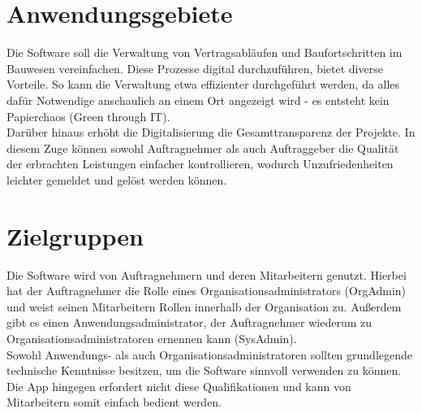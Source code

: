 \section{Anwendungsgebiete}
Die Software soll die Verwaltung von Vertragsabläufen und Baufortschritten im Bauwesen vereinfachen.
Diese Prozesse digital durchzuführen, bietet diverse Vorteile.
So kann die Verwaltung etwa effizienter durchgeführt werden, da alles dafür Notwendige anschaulich an einem Ort angezeigt wird - es entsteht kein Papierchaos (Green through IT).\\
Darüber hinaus erhöht die Digitalisierung die Gesamttransparenz der Projekte.
In diesem Zuge können sowohl Auftragnehmer als auch Auftraggeber die Qualität der erbrachten Leistungen einfacher kontrollieren, wodurch Unzufriedenheiten leichter gemeldet und gelöst werden können.

\section{Zielgruppen}
Die Software wird von Auftragnehmern und deren Mitarbeitern genutzt.
Hierbei hat der Auftragnehmer die Rolle eines Organisationsadministrators (OrgAdmin) und weist seinen Mitarbeitern Rollen innerhalb der Organisation zu.
Außerdem gibt es einen Anwendungsadministrator, der Auftragnehmer wiederum zu Organisationsadministratoren ernennen kann (SysAdmin).\\
Sowohl Anwendungs- als auch Organisationsadministratoren sollten grundlegende technische Kenntnisse besitzen, um die Software sinnvoll verwenden zu können.
Die App hingegen erfordert nicht diese Qualifikationen und kann von Mitarbeitern somit einfach bedient werden.
